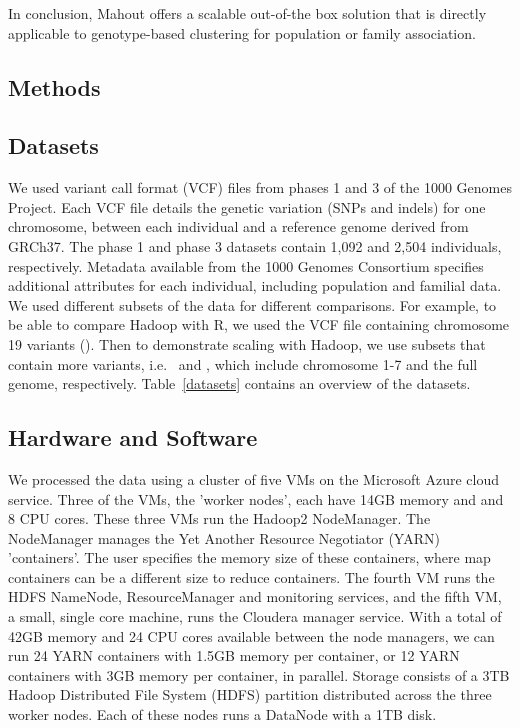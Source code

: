 \documentclass{bioinfo}
\begin{document}
In conclusion, Mahout offers a scalable out-of-the box solution that is directly applicable to genotype-based clustering for population or family association. 



\begin{methods}
\section{Methods}
\subsection*{Datasets}
We used variant call format (VCF) files from phases 1 and 3 of the 1000 Genomes Project.
Each VCF file details the genetic variation (SNPs and indels) for one chromosome, between each individual and a reference genome derived from GRCh37. 
The phase 1 and phase 3 datasets contain 1,092 and 2,504 individuals, respectively.
Metadata available from the 1000 Genomes Consortium specifies additional attributes for each individual, including population and familial data.\\
We used different subsets of the data for different comparisons. For example, to be able to compare Hadoop with R, we used the VCF file containing chromosome 19 variants (\NinteenPhaseone ).
Then to demonstrate scaling with Hadoop, we use subsets that contain more variants, i.e. \SevenPhaseone\ and \FullPhasethree, which include chromosome 1-7 and the full genome, respectively.
Table~\ref{datasets} contains an overview of the datasets.

\subsection*{Hardware and Software}
We processed the data using a cluster of five VMs on the Microsoft Azure cloud service. Three of the VMs, the 'worker nodes', each have 14GB memory and and 8 CPU cores. These three VMs run the Hadoop2 NodeManager. The NodeManager manages the Yet Another Resource Negotiator (YARN) 'containers'.
The user specifies the memory size of these containers, where map containers can be a different size to reduce containers.
The fourth VM runs the HDFS NameNode, ResourceManager and monitoring services, and the fifth VM, a small, single core machine, runs the Cloudera manager service.
With a total of 42GB memory and 24 CPU cores available between the node managers, we can run 24 YARN containers with 1.5GB memory per container, or 12 YARN containers with 3GB memory per container, in parallel.
Storage consists of a 3TB Hadoop Distributed File System (HDFS) partition distributed across the three worker nodes. Each of these nodes runs a DataNode with a 1TB disk.


\end{methods}
\end{document}
